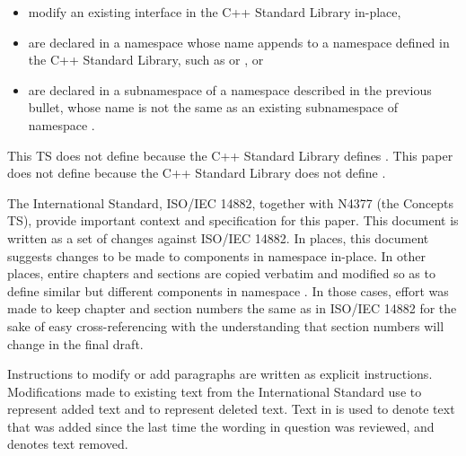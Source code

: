 \begin{itemize}
\item modify an existing interface in the C++ Standard Library in-place,
\item are declared in a namespace whose name appends  to
a namespace defined in the C++ Standard Library, such as  or ,
or
\item are declared in a subnamespace of a namespace described in the previous bullet, whose
name is not the same as an existing subnamespace of namespace .
\end{itemize}


\enterexample This TS does not define  because
the C++ Standard Library defines . This paper does not define
 because the C++ Standard Library does not define
.\exitexample


\pnum
The International Standard, ISO/IEC 14882, together with N4377 (the Concepts TS),
provide important context and specification for this paper. This document is written
as a set of changes against ISO/IEC 14882. In places, this document suggests
changes to be made to components in namespace  in-place. In
other places, entire chapters and sections are copied verbatim and modified so as to
define similar but different components in namespace .
In those cases, effort was made to keep chapter and section numbers the same as in
ISO/IEC 14882 for the sake of easy cross-referencing with the understanding that
section numbers will change in the final draft.

\pnum
Instructions to modify or add paragraphs are written as explicit instructions.
Modifications made to existing text from the International Standard use
 to represent added text and  to
represent deleted text. Text in  is used to denote text that
was added since the last time the wording in question was reviewed, and
 denotes text removed.

